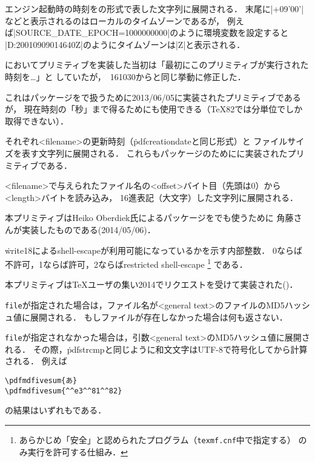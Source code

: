 \documentclass[a4paper,11pt,nomag,dvipdfmx]{jsarticle}
\begin{document}
\begin{cslist}
 \csitem[\.{pdfcreationdate}]
  エンジン起動時の時刻を\texttt{\pdfcreationdate}の形式で表した文字列に展開される．
  末尾に|+09'00'|などと表示されるのはローカルのタイムゾーンであるが，
  例えば|SOURCE_DATE_EPOCH=1000000000|のように環境変数を設定すると
  |D:20010909014640Z|のようにタイムゾーンは|Z|と表示される．

  \epTeX においてプリミティブを実装した当初は「最初にこのプリミティブが実行された時刻を…」と
  していたが，\epTeX~161030からと同じ挙動に修正した．

  これはパッケージを\epTeX で扱うために2013/06/05に実装されたプリミティブであるが，
  現在時刻の「秒」まで得るためにも使用できる（\TeX 82では分単位でしか取得できない）．

  それぞれ<filename>の更新時刻（\.{pdfcreationdate}と同じ形式）と
  ファイルサイズを表す文字列に展開される．
  これらもパッケージのために\epTeX に実装されたプリミティブである．

  <filename>で与えられたファイル名の<offset>バイト目（先頭は0）から<length>バイトを読み込み，
  16進表記（大文字）した文字列に展開される．

  本プリミティブはHeiko Oberdiek氏によるパッケージを\epTeX でも使うために
  角藤さんが実装したものである(2014/05/06)．

  \.{write18}によるshell-escapeが利用可能になっているかを示す内部整数．
  0ならば不許可，1ならば許可，2ならばrestricted shell-escape%
  \footnote{あらかじめ「安全」と認められたプログラム（\texttt{texmf.cnf}中で指定する）
    のみ実行を許可する仕組み．}%
  である．

  本プリミティブは\TeX ユーザの集い2014でリクエストを受けて実装された(\cite{pdfse})．

  \texttt{file}が指定された場合は，ファイル名が<general text>のファイルのMD5ハッシュ値に展開される．
  もしファイルが存在しなかった場合は何も返さない．

  \texttt{file}が指定されなかった場合は，引数<general text>のMD5ハッシュ値に展開される．
  その際，\.{pdfstrcmp}と同じように和文文字はUTF-8で符号化してから計算される．
  例えば
\begin{verbatim}
\pdfmdfivesum{あ}
\pdfmdfivesum{^^e3^^81^^82}
\end{verbatim}
  の結果はいずれも\texttt{}である．


\end{cslist}
\end{document}
